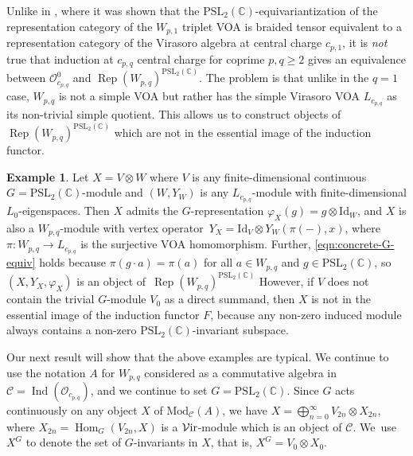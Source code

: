 \documentclass[pdftex]{sigma}
\numberwithin{equation}{section}
\theoremstyle{definition}
\newtheorem{Example}[Theorem]{Example}
\begin{document}
Unlike in \cite[Theorem 7.14]{MY-cp1-Vir}, where it was shown that the $\mathrm{PSL}_2(\mathbb{C})$-equivariantization of the representation category of the $W_{p,1}$ triplet VOA is braided tensor equivalent to a representation category of the Virasoro algebra at central charge $c_{p,1}$, it is \textit{not} true that induction at $c_{p,q}$ central charge for coprime $p,q\geq 2$ gives an equivalence between $\mathcal{O}_{c_{p,q}}^0$ and $\operatorname{Rep}(W_{p,q})^{\mathrm{PSL}_2(\mathbb{C})}$. The problem is that unlike in the $q=1$ case, $W_{p,q}$ is not a simple VOA but rather has the simple Virasoro VOA $L_{c_{p,q}}$ as its non-trivial simple quotient. This allows us to construct objects of~$\operatorname{Rep}(W_{p,q})^{\mathrm{PSL}_2(\mathbb{C})}$ which are not in the essential image of the induction functor.

\begin{Example}
 Let $X=V\otimes W$ where $V$ is any finite-dimensional continuous $G=\mathrm{PSL}_2(\mathbb{C})$-module and $(W,Y_W)$ is any $L_{c_{p,q}}$-module with finite-dimensional $L_0$-eigenspaces. Then $X$ admits the $G$-representation $\varphi_X(g)=g\otimes\mathrm{Id}_W$, and $X$ is also a $W_{p,q}$-module with vertex operator~$Y_X =\mathrm{Id}_V\otimes Y_W(\pi(-),x)$, where $\pi\colon W_{p,q}\rightarrow L_{c_{p,q}}$ is the surjective VOA homomorphism. Further, \eqref{eqn:concrete-G-equiv} holds because $\pi(g\cdot a)=\pi(a)$ for all $a\in W_{p,q}$ and $g\in \mathrm{PSL}_2(\mathbb{C})$, so $(X,Y_X,\varphi_X)$ is an object of~$\operatorname{Rep}(W_{p,q})^{\mathrm{PSL}_2(\mathbb{C})}$ However, if $V$ does not contain the trivial $G$-module $V_0$ as a direct summand, then $X$ is not in the essential image of the induction functor $F$, because any non-zero induced module always contains a non-zero $\mathrm{PSL}_2(\mathbb{C})$-invariant subspace.
 \end{Example}

Our next result will show that the above examples are typical. We continue to use the notation $A$ for $W_{p,q}$ considered as a commutative algebra in $\mathcal{C}=\operatorname{Ind}(\mathcal{O}_{c_{p,q}})$, and we continue to set $G=\mathrm{PSL}_2(\mathbb{C})$. Since $G$ acts continuously on any object $X$ of $\mathrm{Mod}_\mathcal{C}(A)$, we have $X=\bigoplus_{n=0}^\infty V_{2n}\otimes X_{2n}$, where $X_{2n}=\operatorname{Hom}_G(V_{2n},X)$ is a $\mathcal{V}{\rm ir}$-module which is an object of $\mathcal{C}$. We~use~$X^G$ to denote the set of $G$-invariants in $X$, that is, $X^G=V_0\otimes X_0$.
\end{document}
